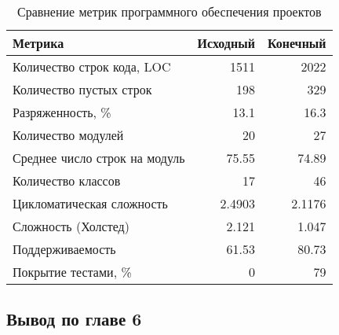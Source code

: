     \begin{table}[H]
        \caption{Сравнение метрик программного обеспечения проектов}
        \begin{center}
            \begin{tabular}{l|r|r}
                \textbf{Метрика} & \textbf{Исходный} & \textbf{Конечный} \\
                \hline
                Количество строк кода, LOC    & 1511    & 2022 \\
                Количество пустых строк       & 198     & 329 \\
                Разряженность, \%             & 13.1    & 16.3 \\
                Количество модулей            & 20      & 27 \\
                Среднее число строк на модуль & 75.55   & 74.89 \\
                Количество классов            & 17      & 46 \\
                Цикломатическая сложность     & 2.4903  & 2.1176 \\
                Сложность (Холстед)           & 2.121   & 1.047 \\
                Поддерживаемость              & 61.53   & 80.73 \\
                Покрытие тестами, \%          & 0       & 79 \\
            \end{tabular}
        \end{center}
    \end{table}

    \subsection*{Вывод по главе 6}
